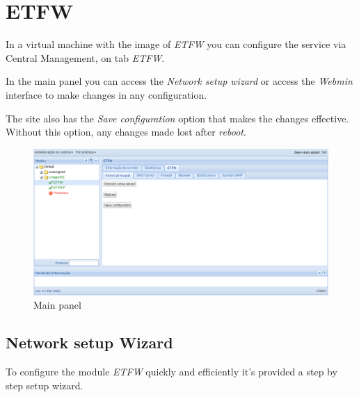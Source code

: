 \section{ETFW}
In a virtual machine with the image of \textit{ETFW} you can configure the service via Central Management, on tab \textit{ETFW}.

In the main panel you can access the \textit{Network setup wizard} or access the \textit{Webmin} interface to make changes in any configuration.

The site also has the \textit{Save configuration} option that makes the changes effective. Without this option, any changes made lost after \textit{reboot}.

\begin{figure}[H]
    \begin{center}
    \includegraphics[scale=0.38]{screenshots/etfw/etfwmain.png}
    \caption{Main panel}
    \label{fig:etfwmain}
    \end{center}
\end{figure}

\subsection{Network setup Wizard}

To configure the module \textit{ETFW} quickly and efficiently it's provided a step by step setup wizard.

